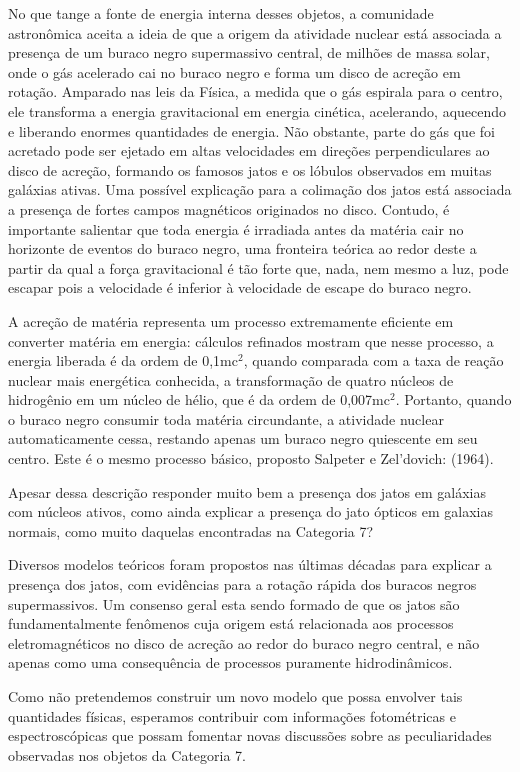 No que tange a fonte de energia interna desses objetos, a comunidade astronômica aceita a ideia de que a origem da atividade nuclear está associada a presença de um buraco negro  supermassivo central, de milhões de massa solar, onde o gás acelerado cai no buraco negro e forma um disco de acreção em rotação. Amparado nas leis da Física, a medida que o gás espirala para o centro, ele transforma a energia gravitacional em energia cinética, acelerando, aquecendo e liberando enormes quantidades de  
energia. Não obstante, parte do gás que foi acretado pode ser ejetado em altas velocidades em direções perpendiculares ao disco de acreção, formando os famosos jatos e os lóbulos observados em muitas galáxias ativas. Uma possível explicação para a colimação dos jatos está associada a presença de fortes campos magnéticos originados no disco. Contudo, é importante salientar que toda energia é irradiada antes da matéria cair no horizonte de eventos do buraco negro, uma fronteira teórica ao redor deste a partir da qual a força gravitacional é tão forte que, nada, nem mesmo a luz, pode escapar pois a velocidade é inferior à velocidade de escape do buraco negro.

A acreção de matéria representa um processo extremamente eficiente em converter matéria em energia: cálculos refinados mostram que nesse processo, a energia liberada é da ordem de 0,1mc$^{2}$, quando comparada com a taxa de reação nuclear mais energética conhecida, a transformação de quatro núcleos de hidrogênio em um núcleo de hélio, que é da ordem de 0,007mc$^{2}$. Portanto, quando o buraco negro consumir toda matéria circundante, a atividade nuclear automaticamente cessa, restando apenas um buraco negro quiescente em seu centro. Este é o mesmo processo básico, proposto Salpeter e  Zel'dovich: (1964).

Apesar dessa descrição responder muito bem a presença dos jatos em galáxias com núcleos ativos, como ainda explicar a presença do jato ópticos em galaxias normais, como muito daquelas encontradas na Categoria 7?

Diversos modelos teóricos foram propostos nas últimas décadas para explicar a presença dos jatos, com evidências para a rotação rápida dos buracos negros supermassivos. Um consenso geral esta sendo formado de que os jatos são fundamentalmente fenômenos cuja origem está relacionada aos processos eletromagnéticos no disco de acreção ao redor do buraco negro central, e não apenas como uma consequência de processos puramente hidrodinâmicos. 

Como não pretendemos construir um novo modelo que possa envolver tais quantidades físicas, esperamos contribuir com informações fotométricas e espectroscópicas que possam fomentar novas discussões sobre as peculiaridades observadas nos objetos da Categoria 7.

